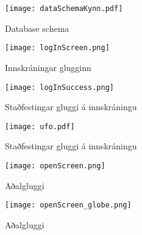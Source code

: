 \documentclass[12pt, git, final]{rureport}
\begin{document}
\begin{figure}
	\centering 
	\texttt{[image: dataSchemaKynn.pdf]}
	\caption{Database schema \label{fig:dataschema}}
\end{figure} 
%
\begin{figure}
	\centering 
	\texttt{[image: logInScreen.png]}
	\caption{Innskráningar glugginn \label{fig:logScreen}}
\end{figure} 

\begin{figure}
	\centering 
	\texttt{[image: logInSuccess.png]}
	\caption{Staðfestingar gluggi á innskráningu \label{fig:logsucces}}
\end{figure} 

\begin{figure}
	\centering 
	\texttt{[image: ufo.pdf]}
	\caption{Staðfestingar gluggi á innskráningu \label{fig:diagram}}
\end{figure}

\begin{figure}[t]
	\centering 
	\texttt{[image: openScreen.png]}
	\caption{Aðalgluggi \label{fig:openScreen}}
\end{figure} 
\begin{figure}[t]
	\centering 
	\texttt{[image: openScreen\_globe.png]}
	\caption{Aðalgluggi \label{fig:openScreen_globe}}
\end{figure} 

\clearpage

\printbibliography
\end{document}
